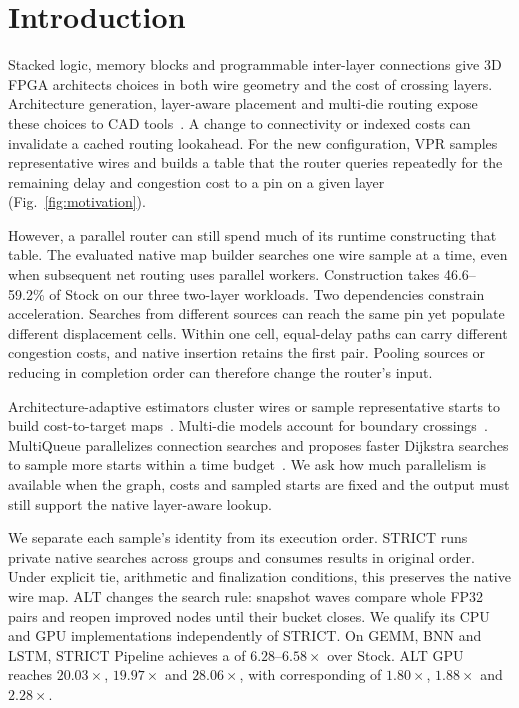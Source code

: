 \section{Introduction}
Stacked logic, memory blocks and programmable inter-layer connections give 3D FPGA architects choices in both wire geometry and the cost of crossing layers. Architecture generation, layer-aware placement and multi-die routing expose these choices to CAD tools~\cite{lazagna,flatland,multidie}. A change to connectivity or indexed costs can invalidate a cached routing lookahead. For the new configuration, VPR samples representative wires and builds a table that the router queries repeatedly for the remaining delay and congestion cost to a pin on a given layer (Fig.~\ref{fig:motivation}).

However, a parallel router can still spend much of its runtime constructing that table. The evaluated native map builder searches one wire sample at a time, even when subsequent net routing uses parallel workers. Construction takes 46.6--59.2\% of Stock \processtime{} on our three two-layer workloads. Two dependencies constrain acceleration. Searches from different sources can reach the same pin yet populate different displacement cells. Within one cell, equal-delay paths can carry different congestion costs, and native insertion retains the first pair. Pooling sources or reducing in completion order can therefore change the router's input.

Architecture-adaptive estimators cluster wires or sample representative starts to build cost-to-target maps~\cite{adaptive_astar,diversity,air}. Multi-die models account for boundary crossings~\cite{multidie}. MultiQueue parallelizes connection searches and proposes faster Dijkstra searches to sample more starts within a time budget~\cite{multiqueue}. We ask how much parallelism is available when the graph, costs and sampled starts are fixed and the output must still support the native layer-aware lookup.

We separate each sample's identity from its execution order. STRICT runs private native searches across groups and consumes results in original order. Under explicit tie, arithmetic and finalization conditions, this preserves the native wire map. ALT changes the search rule: snapshot waves compare whole FP32 pairs and reopen improved nodes until their bucket closes. We qualify its CPU and GPU implementations independently of STRICT. On GEMM, BNN and LSTM, STRICT Pipeline achieves a \constructionspeedup{} of $6.28$--$6.58\times$ over Stock. ALT GPU reaches $20.03\times$, $19.97\times$ and $28.06\times$, with corresponding \processspeedup{} of $1.80\times$, $1.88\times$ and $2.28\times$.

